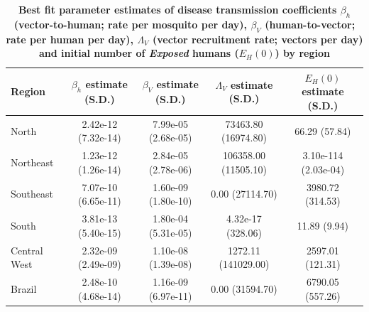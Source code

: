 \documentclass[10pt,letterpaper]{article}
\begin{document}
\begin{table}[!ht]
\begin{adjustwidth}{-2.25in}{0in}
    \centering
    \caption{\textbf{Best fit parameter estimates of disease transmission coefficients $\beta_h$ (vector-to-human; rate per mosquito per day), $\beta_V$ (human-to-vector; rate per human per day), $\Lambda_V$ (vector recruitment rate; vectors per day) and initial number of \textit{Exposed} humans ($E_H(0)$) by region} }
    \begin{tabular}{|l|c|c|c|c|} \hline
     \textbf{Region }  &  \textbf{$\beta_h$ estimate (S.D.)} & \textbf{$\beta_V$ estimate (S.D.)} & \textbf{$\Lambda_V$ estimate (S.D.)} & \textbf{$E_H(0)$ estimate (S.D.)}\\ \hline
     North    & 2.42e-12 (7.32e-14) & 7.99e-05 (2.68e-05) & 73463.80 (16974.80) & 66.29 (57.84)\\\hline
     Northeast &1.23e-12 (1.26e-14) & 2.84e-05 (2.78e-06)& 106358.00 (11505.10) & 3.10e-114 (2.03e-04)\\\hline
     Southeast&7.07e-10 (6.65e-11) & 1.60e-09 (1.80e-10)& 0.00 (27114.70) & 3980.72 (314.53)\\\hline
     South& 3.81e-13 (5.40e-15)& 1.80e-04 (5.31e-05)& 4.32e-17 (328.06) & 11.89 (9.94)\\\hline
     Central West&2.32e-09 (2.49e-09)& 1.10e-08 (1.39e-08)& 1272.11 (141029.00) & 2597.01 (121.31)\\\hline \hline
     Brazil & 2.48e-10 (4.68e-14)& 1.16e-09 (6.97e-11)& 0.00 (31594.70) & 6790.05 (557.26)\\\hline
    \end{tabular}
     \begin{flushleft}
     \end{flushleft}
    
    \label{tab:zika_param_est}
    \end{adjustwidth}
\end{table}

         
\end{document}
